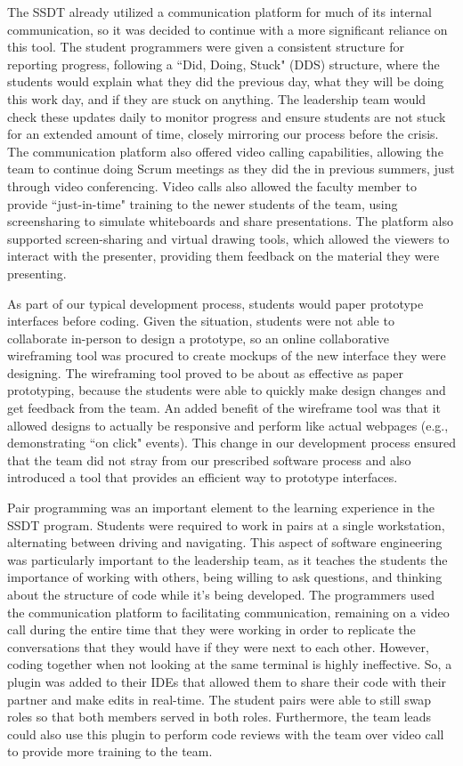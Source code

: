 The SSDT already utilized a communication platform for much of its internal communication, so it was decided to continue with a more significant reliance on this tool. The student programmers were given a consistent structure for reporting progress, following a ``Did, Doing, Stuck" (DDS) structure, where the students would explain what they did the previous day, what they will be doing this work day, and if they are stuck on anything. The leadership team would check these updates daily to monitor progress and ensure students are not stuck for an extended amount of time, closely mirroring our process before the crisis. The communication platform also offered video calling capabilities, allowing the team to continue doing Scrum meetings as they did the in previous summers, just through video conferencing. Video calls also allowed the faculty member to provide ``just-in-time" training to the newer students of the team, using screensharing to simulate whiteboards and share presentations. The platform also supported screen-sharing and virtual drawing tools, which allowed the viewers to interact with the presenter, providing them feedback on the material they were presenting.

As part of our typical development process, students would paper prototype interfaces before coding. Given the situation, students were not able to collaborate in-person to design a prototype, so an online collaborative wireframing tool was procured to create mockups of the new interface they were designing. The wireframing tool proved to be about as effective as paper prototyping, because the students were able to quickly make design changes and get feedback from the team. An added benefit of the wireframe tool was that it allowed designs to actually be responsive and perform like actual webpages (e.g., demonstrating ``on click" events). This change in our development process ensured that the team did not stray from our prescribed software process and also introduced a tool that provides an efficient way to prototype interfaces.

Pair programming was an important element to the learning experience in the SSDT program. Students were required to work in pairs at a single workstation, alternating between driving and navigating. This aspect of software engineering was particularly important to the leadership team, as it teaches the students the importance of working with others, being willing to ask questions, and thinking about the structure of code while it's being developed. The programmers used the communication platform to facilitating communication, remaining on a video call during the entire time that they were working in order to replicate the conversations that they would have if they were next to each other. However, coding together when not looking at the same terminal is highly ineffective. So, a plugin was added to their IDEs that allowed them to share their code with their partner and make edits in real-time. The student pairs were able to still swap roles so that both members served in both roles. Furthermore, the team leads could also use this plugin to perform code reviews with the team over video call to provide more training to the team.


